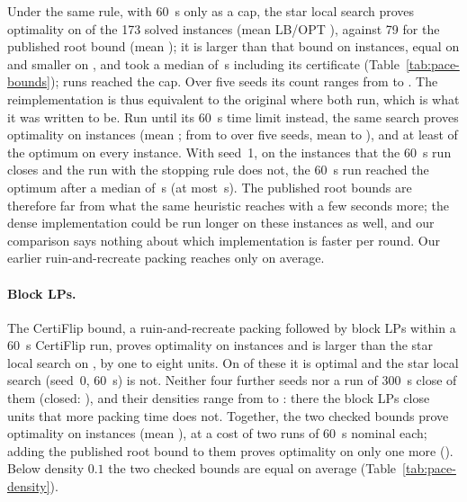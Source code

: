 Under the same rule, with \SI{60}{s} only as a cap, the star local search
proves optimality on \numPaceKrOpt{} of the 173 solved instances (mean LB/OPT
\numPaceKrMean{}), against 79 for the published root bound (mean
\numPaceMeanStar{}); it is larger than that bound on \numPaceKrAbove{}
instances, equal on \numPaceKrEqual{} and smaller on \numPaceKrBelow{}, and
took a median of \numPaceKrTimeMedian{}\,s including its certificate
(Table~\ref{tab:pace-bounds}); \numPaceKrCap{} runs reached the cap.  Over five seeds its count ranges from
\numPaceKrOptSeedLo{} to \numPaceKrOptSeedHi{}.  The reimplementation is thus
equivalent to the original where both run, which is what it was written to
be.  Run until its \SI{60}{s} time limit instead, the same search proves
optimality on \numPaceSlsOpt{} instances (mean \numPaceSlsMean{}; from
\numPaceSlsOptSeedLo{} to \numPaceSlsOptSeedHi{} over five seeds, mean
\numPaceSlsMeanSeedLo{} to \numPaceSlsMeanSeedHi{}), and at least
\numPaceSlsMin{} of the optimum on every instance.  With seed~1, on the
\numPaceReachOptN{} instances that the \SI{60}{s} run closes and the run with
the stopping rule does not, the \SI{60}{s} run reached the optimum after a
median of \numPaceReachOptMedian{}\,s (at most \numPaceReachOptMax{}\,s).  The published root bounds are therefore far
from what the same heuristic reaches with a few seconds more; the dense
implementation could be run longer on these instances as well, and our
comparison says nothing about which implementation is faster per round.
Our earlier ruin-and-recreate packing reaches only \numPacePackMean{} on
average.

\paragraph{Block LPs.}  The CertiFlip bound, a ruin-and-recreate packing
followed by block LPs within a \SI{60}{s} CertiFlip run, proves optimality on
\numPaceOptOurs{} instances and is larger than the star local search on
\numPaceSlsUnderCf{}, by one to eight units.  On \numPaceCfOnly{} of these it
is optimal and the star local search (seed~0, \SI{60}{s}) is not.  Neither
four further seeds nor a run of \SI{300}{s} close \numPaceCfOnlyKept{} of them
(closed: \numPaceCfOnlyClosedList{}), and their densities range from
\numPaceCfOnlyDensLo{} to \numPaceCfOnlyDensHi{}: there the block LPs close
units that more packing time does not.  Together, the two checked bounds
prove optimality on \numPaceBestOpt{} instances (mean \numPaceBestMean{}), at
a cost of two runs of \SI{60}{s} nominal each; adding the published root bound
to them proves optimality on only one more (\numPaceBestMaxOpt{}).  Below
density $0.1$ the two checked bounds are equal on average
(Table~\ref{tab:pace-density}).

